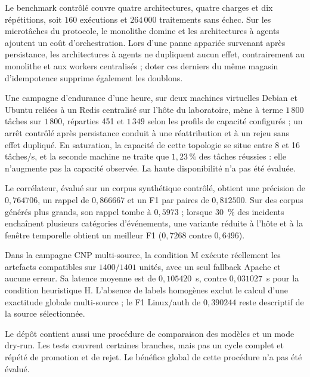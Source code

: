 Le benchmark contrôlé couvre quatre architectures, quatre charges et dix
répétitions, soit $160$ exécutions et $264\,000$ traitements sans échec. Sur
les microtâches du protocole, le monolithe domine et les architectures à
agents ajoutent un coût d'orchestration. Lors d'une panne appariée survenant
après persistance, les architectures à agents ne dupliquent aucun effet,
contrairement au monolithe et aux workers centralisés ; doter ces derniers du
même magasin d'idempotence supprime également les doublons.

Une campagne d'endurance d'une heure, sur deux machines virtuelles Debian et
Ubuntu reliées à un Redis centralisé sur l'hôte du laboratoire, mène à terme
$1\,800$ tâches sur $1\,800$, réparties 451 et $1\,349$ selon les profils de
capacité configurés ; un arrêt contrôlé après persistance conduit à une
réattribution et à un rejeu sans effet dupliqué. En saturation, la capacité
de cette topologie se situe entre 8 et 16 tâches/s, et la seconde machine ne
traite que $1{,}23\,\%$ des tâches réussies : elle n'augmente pas la capacité
observée. La haute disponibilité n'a pas été évaluée.

Le corrélateur, évalué sur un corpus synthétique contrôlé, obtient une
précision de $0{,}764706$, un rappel de $0{,}866667$ et un F1 par paires de
$0{,}812500$. Sur des corpus générés plus grands, son rappel tombe à
$0{,}5973$ ; lorsque 30~\% des incidents enchaînent plusieurs catégories
d'événements, une variante réduite à l'hôte et à la fenêtre temporelle obtient
un meilleur F1 ($0{,}7268$ contre $0{,}6496$).

Dans la campagne CNP multi-source, la condition M exécute réellement les
artefacts compatibles sur $1400/1401$ unités, avec un seul fallback Apache et
aucune erreur. Sa latence moyenne est de $0{,}105420$~s, contre $0{,}031027$~s
pour la condition heuristique H. L'absence de labels homogènes exclut le
calcul d'une exactitude globale multi-source ; le F1 Linux/auth de
$0{,}390244$ reste descriptif de la source sélectionnée.

Le dépôt contient aussi une procédure de comparaison des modèles et un mode
dry-run. Les tests couvrent certaines branches, mais pas un cycle complet et
répété de promotion et de rejet. Le bénéfice global de cette procédure n'a pas
été évalué.

